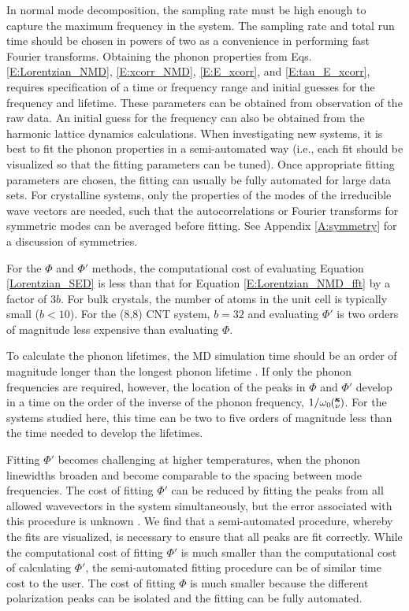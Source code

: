 In normal mode decomposition, the sampling rate must be high enough to 
capture the maximum frequency in the system. The sampling rate and total 
run time should be chosen in powers of two as a convenience in performing 
fast Fourier transforms. Obtaining the phonon properties from 
Eqs. \eqref{E:Lorentzian_NMD}, \eqref{E:xcorr_NMD}, 
\eqref{E:E_xcorr}, and \eqref{E:tau_E_xcorr}, 
requires specification of a time or frequency 
range and initial guesses for the frequency and lifetime. These parameters 
can be obtained from observation of the raw data. An initial guess for the 
frequency can also be obtained from the harmonic lattice dynamics 
calculations. When investigating new systems, it is best to fit the phonon 
properties in a semi-automated way (i.e., each fit should be visualized so 
that the fitting parameters can be tuned). Once appropriate fitting 
parameters are chosen, the fitting can usually be fully automated for large 
data sets. For crystalline systems, only the properties of the modes of the 
irreducible wave vectors are needed, such that the autocorrelations or 
Fourier transforms for symmetric modes can be averaged before fitting. 
See Appendix \ref{A:symmetry} for a discussion of symmetries.

For the $\Phi$ and $\Phi'$ methods, the computational cost of 
evaluating Equation \eqref{Lorentzian_SED} is less than that for 
Equation \eqref{E:Lorentzian_NMD_fft} by a factor of $3b$. 
For bulk crystals, the number of atoms in the unit cell is 
typically small 
($b<10$).  For the (8,8) CNT system, $b=32$ and evaluating $\Phi'$ is 
two orders of magnitude 
less expensive than evaluating $\Phi$.

To calculate the phonon lifetimes, the MD simulation time should be an 
order of magnitude 
longer than the longest phonon lifetime \cite{thomas_water_2010}.  
If only the 
phonon frequencies 
are required, however, the location of the peaks in $\Phi$ and $\Phi'$ 
develop in a time on 
the order of the inverse of the phonon frequency, $1/\omega_0\mspace{-4.0mu}\left(\mspace{-8.0mu} \begin{smallmatrix}&\pmb{\kappa} \\&\nu\end{smallmatrix} \mspace{-3.0mu}\right)$. For the 
systems studied 
here, this time can be two to five orders of magnitude less than the time 
needed to develop 
the lifetimes.

Fitting $\Phi'$ becomes challenging at higher temperatures, when the 
phonon linewidths 
broaden and become comparable to the spacing between mode frequencies. 
The cost of 
fitting $\Phi'$ can be reduced by fitting the peaks from all allowed 
wavevectors in the 
system simultaneously, but the error associated with this procedure is 
unknown 
\cite{shiomi_thermal_2011}. We find that a semi-automated procedure, 
whereby the fits are 
visualized, is necessary to ensure that all peaks are fit correctly.  
While the 
computational cost of fitting $\Phi'$ is much smaller than the 
computational cost of 
calculating $\Phi'$, the semi-automated fitting procedure can be of 
similar time cost 
to the user. The cost of fitting $\Phi$ is much smaller because the 
different polarization 
peaks can be isolated and the fitting can be fully automated.


